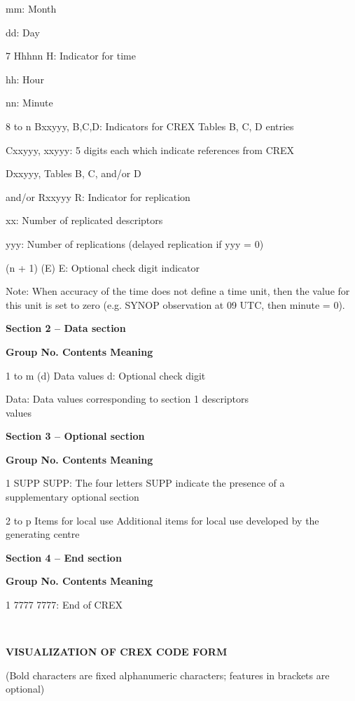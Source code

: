 mm: Month

dd: Day

7 Hhhnn H: Indicator for time

hh: Hour

nn: Minute

8 to n Bxxyyy, B,C,D: Indicators for CREX Tables B, C, D entries

Cxxyyy, xxyyy: 5 digits each which indicate references from CREX

Dxxyyy, Tables B, C, and/or D

and/or Rxxyyy R: Indicator for replication

xx: Number of replicated descriptors

yyy: Number of replications (delayed replication if yyy = 0)

(n + 1) (E) E: Optional check digit indicator

Note: When accuracy of the time does not define a time unit, then the value for this unit is set to zero (e.g. SYNOP observation at 09 UTC, then minute = 0).

\textbf{Section 2 -- Data section}

\textbf{Group No. Contents Meaning}

1 to m (d) Data values d: Optional check digit

Data: Data values corresponding to section 1 descriptors\\
values

\textbf{Section 3 -- Optional section}

\textbf{Group No. Contents Meaning}

1 SUPP SUPP: The four letters SUPP indicate the presence of a\\
supplementary optional section

2 to p Items for local use Additional items for local use developed by the\\
generating centre

\textbf{Section 4 -- End section}

\textbf{Group No. Contents Meaning}

1 7777 7777: End of CREX

\textbf{\\
}

\textbf{VISUALIZATION OF CREX CODE FORM}

(Bold characters are fixed alphanumeric characters; features in brackets are optional)

